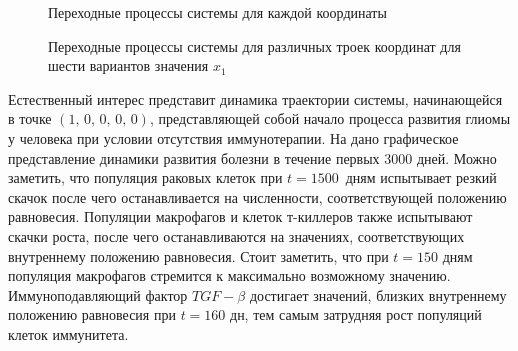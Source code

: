\documentclass[14pt,a4paper]{extarticle}
\begin{document}
\begin{example}
\begin{figure}[h]
			\caption{Переходные процессы системы для каждой координаты}
			\label{fig:in_D}
		\end{figure}
		\begin{figure}[h]
			\centering
			\caption{Переходные процессы системы для различных троек координат для шести вариантов значения $x_1$}
			\label{fig:in_D_3d}
		\end{figure}
		
		Естественный интерес представит динамика траектории системы, начинающейся в точке $\left(1,\,0,\,0,\,0,\,0\right)$, представляющей собой начало процесса развития глиомы у человека при условии отсутствия иммунотерапии. На  дано графическое представление динамики развития болезни в течение первых 3000 дней. Можно заметить, что популяция раковых клеток при $t=1500$~дням испытывает резкий скачок после чего останавливается на численности, соответствующей положению равновесия. Популяции макрофагов и клеток т-киллеров также испытывают скачки роста, после чего останавливаются на значениях, соответствующих внутреннему положению равновесия. Стоит заметить, что при $t=150$ дням популяция макрофагов стремится к максимально возможному значению. Иммуноподавляющий фактор $TGF-\beta$ достигает значений, близких внутреннему положению равновесия при $t=160$ дн, тем самым затрудняя рост популяций клеток иммунитета.
		

\end{example}
\end{document}

